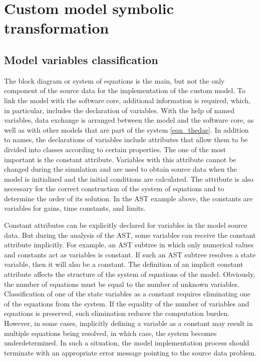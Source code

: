 \documentclass[lettersize,journal]{IEEEtran}
\begin{document}
\section{Custom model symbolic transformation}

\subsection{Model variables classification} \label{sec_varclass}
The block diagram or system of equations is the main, but not the only component of the source data for the implementation 
of the custom model. To link the model with the software core, additional information is required, which, in particular, 
includes the declaration of variables. With the help of named variables, data exchange is arranged between 
the model and the software core, as well as with other models that are part of the system \eqref{eqn_thedae}. 
In addition to names, the declarations of variables include attributes that allow them to be divided into classes according to
certain properties. The one of the most important is the constant attribute. Variables with this attribute cannot be changed during the
simulation and are used to obtain source data when the model is initialized and the initial conditions are calculated. 
The attribute is also necessary for the correct construction of the system of equations and to determine the order of its solution. In the AST example above, the constants are variables for gains, time constants, and limits.

Constant attributes can be explicitly declared for variables in the model source data. But during the analysis
of the AST, some variables can receive the constant attribute implicitly. For example, an AST subtree in which only 
numerical values and constants act as variables is constant. If such an AST subtree resolves a state variable, then it will 
also be a constant. The definition of an implicit constant attribute affects the structure of the system of equations of the model.
Obviously, the number of equations must be equal to the number of unknown variables. Classification of one of the state variables 
as a constant requires eliminating one of the equations from the system. If the equality of the number of variables and 
equations is preserved, such elimination reduces the computation burden. However, in some cases, implicitly defining 
a variable as a constant may result in multiple equations being resolved, in which case, the system becomes underdetermined. 
In such a situation, the model implementation process should terminate with an appropriate error message pointing to the source data
problem.
\end{document}
